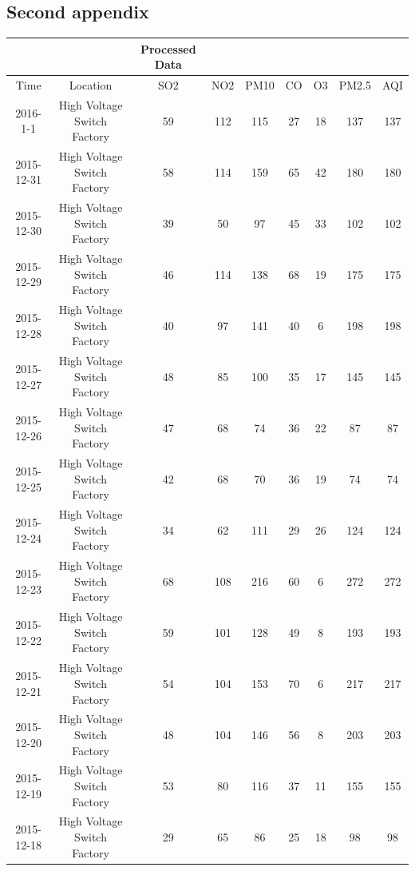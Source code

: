 \documentclass[a4paper,11pt]{article}
\begin{document}
\begin{appendices}
\section{Second appendix}

\begin{longtable}{ccccccccc}
 &&Processed Data&&&&&&\\
 \hline
Time  & Location & SO2   & NO2   & PM10  & CO    & O3    & PM2.5 & AQI \\
\hline
\endhead
2016-1-1 & High Voltage Switch Factory & 59    & 112   & 115   & 27    & 18    & 137   & 137 \\
    2015-12-31 & High Voltage Switch Factory & 58    & 114   & 159   & 65    & 42    & 180   & 180 \\
    2015-12-30 & High Voltage Switch Factory & 39    & 50    & 97    & 45    & 33    & 102   & 102 \\
    2015-12-29 & High Voltage Switch Factory & 46    & 114   & 138   & 68    & 19    & 175   & 175 \\
    2015-12-28 & High Voltage Switch Factory & 40    & 97    & 141   & 40    & 6     & 198   & 198 \\
    2015-12-27 & High Voltage Switch Factory & 48    & 85    & 100   & 35    & 17    & 145   & 145 \\
    2015-12-26 & High Voltage Switch Factory & 47    & 68    & 74    & 36    & 22    & 87    & 87 \\
    2015-12-25 & High Voltage Switch Factory & 42    & 68    & 70    & 36    & 19    & 74    & 74 \\
    2015-12-24 & High Voltage Switch Factory & 34    & 62    & 111   & 29    & 26    & 124   & 124 \\
    2015-12-23 & High Voltage Switch Factory & 68    & 108   & 216   & 60    & 6     & 272   & 272 \\
    2015-12-22 & High Voltage Switch Factory & 59    & 101   & 128   & 49    & 8     & 193   & 193 \\
    2015-12-21 & High Voltage Switch Factory & 54    & 104   & 153   & 70    & 6     & 217   & 217 \\
    2015-12-20 & High Voltage Switch Factory & 48    & 104   & 146   & 56    & 8     & 203   & 203 \\
    2015-12-19 & High Voltage Switch Factory & 53    & 80    & 116   & 37    & 11    & 155   & 155 \\
    2015-12-18 & High Voltage Switch Factory & 29    & 65    & 86    & 25    & 18    & 98    & 98 \\

\end{longtable}
\end{appendices}
\end{document}
